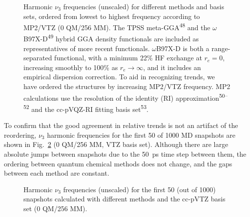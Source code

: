 \begin{figure}[h]
  \centering
  \caption{Harmonic \(\nu_{3}\) frequencies (unscaled) for different methods and basis sets, ordered from lowest to highest frequency according to MP2/VTZ (0 QM/256 MM). The TPSS meta-GGA\textsuperscript{48} and the \(\omega\)B97X-D\textsuperscript{49} hybrid GGA density functionals are included as representatives of more recent functionals. \(\omega\)B97X-D is both a range-separated functional, with a minimum 22\% HF exchange at \(r_{e} = 0\), increasing smoothly to 100\% as \(r_{e} \rightarrow \infty\), and it includes an empirical dispersion correction. To aid in recognizing trends, we have ordered the structures by increasing MP2/VTZ frequency. MP2 calculations use the resolution of the identity (RI) approximation\textsuperscript{50--52} and the cc-pVQZ-RI fitting basis set\textsuperscript{53}.}
  \label{paper_02:fig:S3}
\end{figure}

To confirm that the good agreement in relative trends is not an artifact of the reordering,  \(\nu_{3}\) harmonic frequencies for the first \num{50} of \num{1000} MD snapshots are shown in Fig.~\ref{paper_02:fig:S4} (0 QM/256 MM, VTZ basis set). Although there are large absolute jumps between snapshots due to the \SI{50}{\pico\second} time step between them, the ordering between quantum chemical methods does not change, and the gaps between each method are constant.

\begin{figure}[h]
  \centering
  \caption{Harmonic \(\nu_{3}\) frequencies (unscaled) for the first \num{50} (out of \num{1000}) snapshots calculated with different methods and the cc-pVTZ basis set (0 QM/256 MM).}
  \label{paper_02:fig:S4}
\end{figure}

